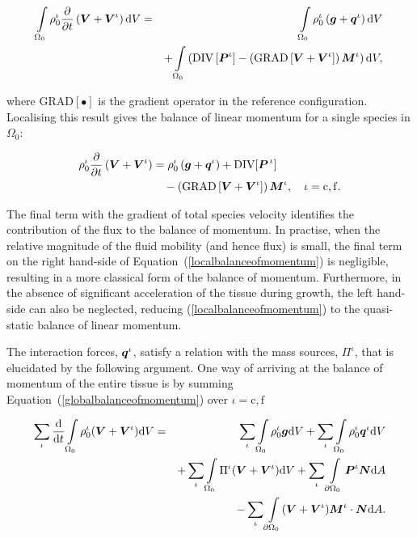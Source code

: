 \begin{eqnarray}
\int\limits_{\Omega_0} \rho_0^\iota\frac{\partial}{\partial
  t}\left(\mbox{\boldmath$ V$}+\mbox{\boldmath$ V$}^\iota\right) \mathrm{d}V &=&
\int\limits_{\Omega_0}\rho^\iota_0\left(\mbox{\boldmath$ g$}+\mbox{\boldmath$ q$}^\iota\right)
\mathrm{d}V \nonumber\\ & &+
\int\limits_{\Omega_0}\left(\mathrm{DIV}\left[\mbox{\boldmath$ P$}^\iota\right] -
\left(\mathrm{GRAD}\left[\mbox{\boldmath$ V$}+\mbox{\boldmath$ V$}^\iota\right]\right)\mbox{\boldmath$ M$}^\iota\right)
\mathrm{d}V, \nonumber
\end{eqnarray}

\noindent where $\mathrm{{GRAD}[\bullet]}$ is the gradient operator in
the reference configuration. Localising this result gives the balance
of linear momentum for a single species in $\Omega_{0}$:

\begin{equation}
\begin{split}
\rho_0^\iota\frac{\partial}{\partial t}\left(\mbox{\boldmath$ V$}+\mbox{\boldmath$ V$}^\iota\right) &
=\rho^\iota_0\left(\mbox{\boldmath$ g$}+\mbox{\boldmath$ q$}^\iota\right) +
\mathrm{DIV}[\mbox{\boldmath$ P$}^{\,\iota}]\\ & \quad -\left(\mathrm{GRAD}\left[\mbox{\boldmath$ V$}+
  \mbox{\boldmath$ V$}^\iota\right]\right)\mbox{\boldmath$ M$}^\iota, \quad \iota = \mathrm{c,f}.
\label{localbalanceofmomentum}
\end{split}
\end{equation} 

The final term with the gradient of total species velocity identifies
the contribution of the flux to the balance of momentum. In practise,
when the relative magnitude of the fluid mobility (and hence flux) is
small, the final term on the right hand-side of
Equation~(\ref{localbalanceofmomentum}) is negligible, resulting in a
more classical form of the balance of momentum. Furthermore, in the
absence of significant acceleration of the tissue during growth, the
left hand-side can also be neglected, reducing
(\ref{localbalanceofmomentum}) to the quasi-static balance of linear
momentum.

The interaction forces, $\mbox{\boldmath$ q$}^\iota$, satisfy a relation with the mass
sources, $\Pi^\iota$, that is elucidated by the following
argument. One way of arriving at the balance of momentum of the entire
tissue is by summing Equation~(\ref{globalbalanceofmomentum}) over
$\iota = \mathrm{c,f}$

\begin{eqnarray}
\sum\limits_{\iota}\frac{\mathrm{d}}{\mathrm{d}t}
\int\limits_{\Omega_0} \rho_0^\iota(\mbox{\boldmath$ V$}+\mbox{\boldmath$ V$}^\iota) \mathrm{d}V &=&
\sum\limits_{\iota}\int\limits_{\Omega_0} \rho^\iota_0\mbox{\boldmath$ g$} \mathrm{d}V
+ \sum\limits_{\iota}\int\limits_{\Omega_0} \rho^\iota_0\mbox{\boldmath$ q$}^\iota
\mathrm{d}V\nonumber\\& & + \sum\limits_{\iota}\int\limits_{\Omega_0}
\Pi^\iota(\mbox{\boldmath$ V$}+\mbox{\boldmath$ V$}^\iota) \mathrm{d}V + \sum\limits_{\iota}
\int\limits_{\partial \Omega_0}\mbox{\boldmath$ P$}^\iota\mbox{\boldmath$ N$} \mathrm{d}A\nonumber\\ & &
- \sum\limits_{\iota}\int\limits_{\partial
  \Omega_0}(\mbox{\boldmath$ V$}+\mbox{\boldmath$ V$}^\iota)\mbox{\boldmath$ M$}^\iota\cdot\mbox{\boldmath$ N$} \mathrm{d}A.
\label{momentumsummation}
\end{eqnarray}

